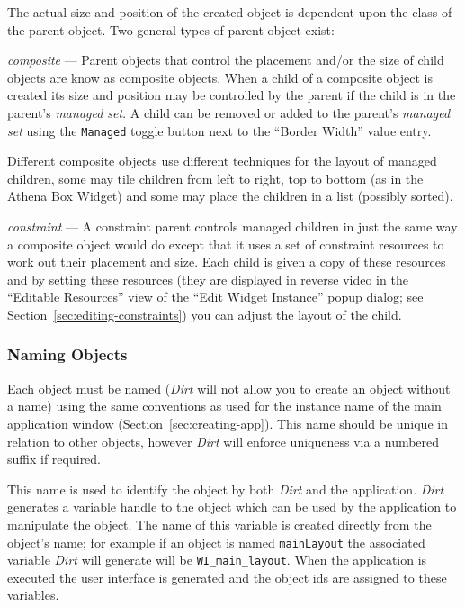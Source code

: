 The actual size and position of the created object is dependent upon
the class of the parent object.  Two general types of parent object exist:
\begin{description}
\item{\em composite} --- Parent objects that control the placement and/or
the size of child objects are know as composite objects.  When a child of a
composite object is created its size and position may be controlled by the
parent if the child is in the parent's {\em managed set}.  A child can be
removed or added to the parent's {\em managed set} using the {\tt Managed}
toggle button next to the ``Border Width'' value entry.

Different composite objects use different techniques for the layout of
managed children, some may tile children from left to right, top to bottom
(as in the Athena Box Widget) and some may place the children in a list
(possibly sorted).
\item{\em constraint} --- A constraint parent controls managed children in
just the same way a composite object would do except that it uses a set of
constraint resources to work out their placement and size.  Each child is
given a copy of these resources and by setting these resources (they are
displayed in reverse video in the ``Editable Resources'' view of the ``Edit
Widget Instance'' popup dialog; see Section~\ref{sec:editing-constraints})
you can adjust the layout of the child.
\end{description}

\subsubsection{Naming Objects}
Each object must be named ({\em Dirt} will not allow you to create an object
without a name) using the same conventions as used for the instance
name of the main application window (Section~\ref{sec:creating-app}).
This name should be unique in relation
to other objects, however {\em Dirt} will enforce uniqueness via a
numbered suffix if required.

This name is used to identify the object by both {\em Dirt} and the
application.  {\em Dirt} generates a variable handle to the object which can
be used by the application to manipulate the object.  The name of this
variable is created directly from the object's name; for example if an object
is named {\tt mainLayout} the associated variable {\em Dirt} will generate
will be {\tt WI\_main\_layout}. When the application is executed the user
interface is generated and the object ids are assigned to these 
variables.

